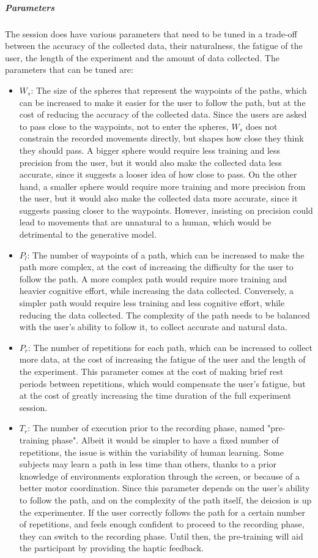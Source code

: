 \documentclass[12pt]{report}
\begin{document}
\subparagraph{Parameters}
The session does have various parameters that need to be tuned in a trade-off between the accuracy of the collected data, their naturalness, the fatigue of the user, the length of the experiment and the amount of data collected. The parameters that can be tuned are:

\begin{itemize}

    \item $W_s$: The size of the spheres that represent the waypoints of the paths, which can be increased to make it easier for the user to follow the path, but at the cost of reducing the accuracy of the collected data. Since the users are asked to pass close to the waypoints, not to enter the spheres, $W_s$ does not constrain the recorded movements directly, but shapes how close they think they should pass. A bigger sphere would require less training and less precision from the user, but it would also make the collected data less accurate, since it suggests a looser idea of how close to pass. On the other hand, a smaller sphere would require more training and more precision from the user, but it would also make the collected data more accurate, since it suggests passing closer to the waypoints. However, insisting on precision could lead to movements that are unnatural to a human, which would be detrimental to the generative model. 
    \item $P_l$: The number of waypoints of a path, which can be increased to make the path more complex, at the cost of increasing the difficulty for the user to follow the path. A more complex path would require more training and heavier cognitive effort, while increasing the data collected. Conversely, a simpler path would require less training and less cognitive effort, while reducing the data collected. The complexity of the path needs to be balanced with the user's ability to follow it, to collect accurate and natural data.
    \item $P_r$: The number of repetitions for each path, which can be increased to collect more data, at the cost of increasing the fatigue of the user and the length of the experiment. This parameter comes at the cost of making brief rest periods between repetitions, which would compensate the user's fatigue, but at the cost of greatly increasing the time duration of the full experiment session.
    \item $T_r$: The number of execution prior to the recording phase, named "pre-training phase". Albeit it would be simpler to have a fixed number of repetitions, the issue is within the variability of human learning. Some subjects may learn a path in less time than others, thanks to a prior knowledge of environments exploration through the screen, or because of a better motor coordination. Since this parameter depends on the user's ability to follow the path, and on the complexity of the path itself, the deicsion is up the experimenter. If the user correctly follows the path for a certain number of repetitions, and feels enough confident to proceed to the recording phase, they can switch to the recording phase. Until then, the pre-training will aid the participant by providing the haptic feedback.
    

\end{itemize}
\end{document}
